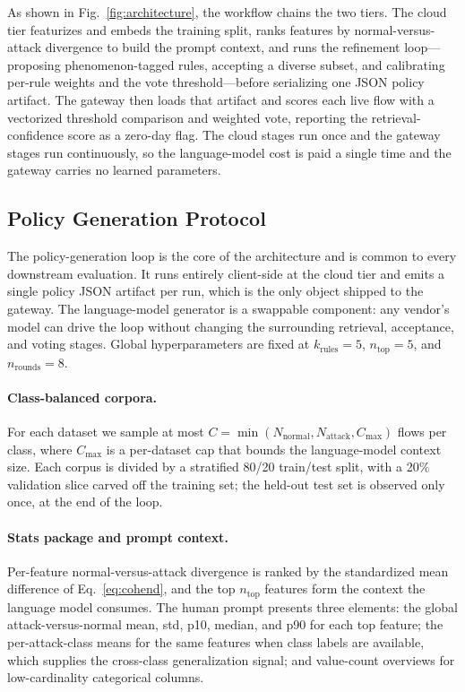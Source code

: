 As shown in Fig.~\ref{fig:architecture}, the workflow chains the two tiers. The
cloud tier featurizes and embeds the training split, ranks features by
normal-versus-attack divergence to build the prompt context, and runs the
refinement loop---proposing phenomenon-tagged rules, accepting a diverse
subset, and calibrating per-rule weights and the vote threshold---before
serializing one JSON policy artifact. The gateway then loads that artifact and
scores each live flow with a vectorized threshold comparison and weighted vote,
reporting the retrieval-confidence score as a zero-day flag. The cloud stages
run once and the gateway stages run continuously, so the language-model cost is
paid a single time and the gateway carries no learned parameters.


\subsection{Policy Generation Protocol}
\label{subsec:policy_generation}

The policy-generation loop is the core of the architecture and is common to
every downstream evaluation. It runs entirely client-side at the cloud tier
and emits a single policy JSON artifact per run, which is the only object
shipped to the gateway. The language-model generator is a swappable component:
any vendor's model can drive the loop without changing the surrounding
retrieval, acceptance, and voting stages. Global hyperparameters are fixed at
$k_{\text{rules}}=5$, $n_{\text{top}}=5$, and $n_{\text{rounds}}=8$.

\paragraph{Class-balanced corpora.}
For each dataset we sample at most $C = \min(N_{\text{normal}},
N_{\text{attack}}, C_{\max})$ flows per class, where $C_{\max}$ is a
per-dataset cap that bounds the language-model context size. Each corpus is
divided by a stratified 80/20 train/test split, with a 20\% validation slice
carved off the training set; the held-out test set is observed only once, at
the end of the loop.

\paragraph{Stats package and prompt context.}
Per-feature normal-versus-attack divergence is ranked by the standardized mean
difference of Eq.~\ref{eq:cohend}, and the top $n_{\text{top}}$ features form
the context the language model consumes. The human prompt presents three
elements: the global attack-versus-normal mean, std, p10, median, and p90 for
each top feature; the per-attack-class means for the same features when class
labels are available, which supplies the cross-class generalization signal;
and value-count overviews for low-cardinality categorical columns.

